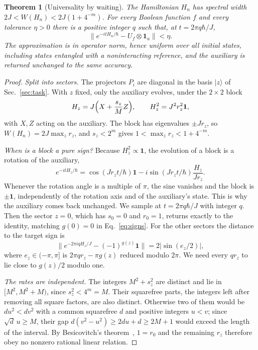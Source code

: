 \documentclass[11pt,a4paper]{article}
\providecommand{\openone}{\mathbf{1}}
\newtheorem{theorem}{Theorem}
\newcommand{\ket}[1]{\lvert #1\rangle}
\newcommand{\norm}[1]{\lVert #1\rVert}
\newcommand{\id}{\openone}
\begin{document}
\begin{theorem}[Universality by waiting]
\label{thm:existence}
The Hamiltonian $H_n$ has spectral width $2J<W(H_n)<2J(1+4^{-m})$. For every Boolean function $f$ and every tolerance $\eta>0$ there is a positive integer $q$ such that, at $t=2\pi q\hbar/J$,
\begin{equation}
 \norm{e^{-itH_n/\hbar}-U_f\otimes\id_a}<\eta .
 \label{eq:full}
\end{equation}
The approximation is in operator norm, hence uniform over all initial states, including states entangled with a noninteracting reference, and the auxiliary is returned unchanged to the same accuracy.
\end{theorem}

\begin{proof}
\emph{Split into sectors.} The projectors $P_i$ are diagonal in the basis $\ket z$ of Sec.~\ref{sec:task}. With $z$ fixed, only the auxiliary evolves, under the $2\times2$ block
\begin{equation}
 H_z=J\Bigl(X+\frac{s_z}{M}Z\Bigr),\qquad H_z^2=J^2r_z^2\id,
 \label{eq:block}
\end{equation}
with $X,Z$ acting on the auxiliary. The block has eigenvalues $\pm Jr_z$, so $W(H_n)=2J\max_zr_z$, and $s_z<2^m$ gives $1<\max_zr_z<1+4^{-m}$.

\emph{When is a block a pure sign?} Because $H_z^2\propto\id$, the evolution of a block is a rotation of the auxiliary,
\begin{equation*}
 e^{-itH_z/\hbar}=\cos(Jr_zt/\hbar)\id-i\sin(Jr_zt/\hbar)\frac{H_z}{Jr_z}.
\end{equation*}
Whenever the rotation angle is a multiple of $\pi$, the sine vanishes and the block is $\pm\id$, independently of the rotation axis and of the auxiliary's state. This is why the auxiliary comes back unchanged. We sample at $t=2\pi q\hbar/J$ with integer $q$. Then the sector $z=0$, which has $s_0=0$ and $r_0=1$, returns exactly to the identity, matching $g(0)=0$ in Eq.~\eqref{eq:signs}. For the other sectors the distance to the target sign is
\begin{equation}
 \norm{e^{-2\pi iqH_z/J}-(-1)^{g(z)}\id}=2\bigl|\sin(e_z/2)\bigr| ,
 \label{eq:blockerror}
\end{equation}
where $e_z\in(-\pi,\pi]$ is $2\pi qr_z-\pi g(z)$ reduced modulo $2\pi$. We need every $qr_z$ to lie close to $g(z)/2$ modulo one.

\emph{The rates are independent.} The integers $M^2+s_z^2$ are distinct and lie in $[M^2,M^2+M)$, since $s_z^2<4^m=M$. Their squarefree parts, the integers left after removing all square factors, are also distinct. Otherwise two of them would be $du^2<dv^2$ with a common squarefree $d$ and positive integers $u<v$; since $\sqrt d\,u\ge M$, their gap $d(v^2-u^2)\ge2du+d\ge2M+1$ would exceed the length of the interval. By Besicovitch's theorem~\cite{Besicovitch1940}, $1=r_0$ and the remaining $r_z$ therefore obey no nonzero rational linear relation.


\end{proof}
\end{document}
